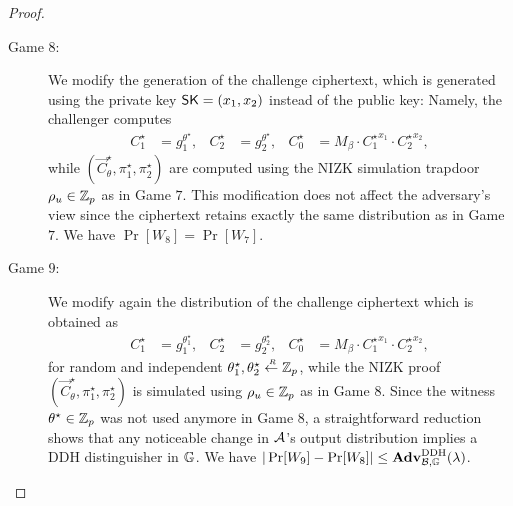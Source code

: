 \begin{proof}
\begin{description}
\item[\textsf{Game} $8$:]  We modify the generation of the challenge ciphertext, which is generated using the private key $\mathsf{SK}=(x_1,x_2)$ instead
of the public key: Namely, the challenger computes 
   \begin{align*}
     C_1^\star &= g_1^{\theta^\star}, & C_2^\star &= g_2^{\theta^\star},    &  C_0^\star &= M_{\beta} \cdot {C_1^\star}^{x_1} \cdot  {C_2^\star}^{x_2} , 
        \end{align*} 
while $(\vec{C}_\theta^\star,\pi_1^\star,\pi_2^\star)$ are computed using the NIZK simulation trapdoor $\rho_u \in \mathbb{Z}_p$ as in Game $7$. 
This modification does not affect the adversary's view since the ciphertext retains exactly the same distribution as in Game $7$. 
We have $\Pr[W_8]=\Pr[W_7]$.  \smallskip \smallskip

\item[\textsf{Game} $9$:] We modify again the distribution of the challenge ciphertext which is obtained as 
   \begin{align*}
     C_1^\star &= g_1^{\theta_1^\star}, & C_2^\star &= g_2^{\theta_2^\star},    &  C_0^\star &= M_{\beta} \cdot {C_1^\star}^{x_1} \cdot  {C_2^\star}^{x_2} , 
        \end{align*} 
				for random and independent $\theta_1^\star,\theta_2^\star \stackrel{{\scriptscriptstyle \mkern4mu R}}{\gets} \mathbb{Z}_p$, 
while the NIZK proof $(\vec{C}_\theta^\star,\pi_1^\star,\pi_2^\star)$ is simulated using $\rho_u \in \mathbb{Z}_p$ as in Game $8$.  Since 
the witness $\theta^\star \in \mathbb{Z}_p$ was not used anymore in Game $8$, a straightforward reduction shows that  any noticeable change in $\mathcal{A}$'s output distribution implies a DDH distinguisher in $\mathbb{G}$. We have 
$|\Pr[W_9]-\Pr[W_8]| \leq   \mathbf{Adv}_{\mathcal{B},\mathbb{G}}^{\mathrm{DDH}}(\lambda)$. \medskip 


\end{description}
\end{proof}
